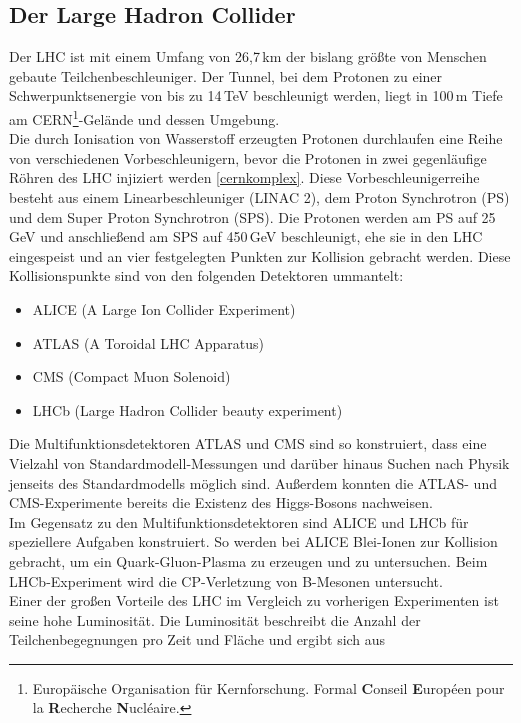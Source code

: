 \subsection{Der Large Hadron Collider}
Der LHC ist mit einem Umfang von 26,7\,km der bislang größte von Menschen gebaute Teilchenbeschleuniger. Der Tunnel, bei dem Protonen zu einer Schwerpunktsenergie von bis zu 14\,TeV beschleunigt werden, liegt in 100\,m Tiefe am CERN\footnote{Europäische Organisation für Kernforschung. Formal \textbf{C}onseil \textbf{E}uropéen pour la \textbf{R}echerche \textbf{N}ucléaire.}-Gelände und dessen Umgebung.\\
Die durch Ionisation von Wasserstoff erzeugten Protonen \cite{duoplasma} durchlaufen eine Reihe von verschiedenen Vorbeschleunigern, bevor die Protonen in zwei gegenläufige Röhren des LHC injiziert werden \ref{cernkomplex}. 
Diese Vor\-be\-schleuniger\-reihe besteht aus einem Linearbeschleuniger (LINAC 2), dem Proton Synchrotron (PS) und dem Super Proton Synchrotron (SPS). Die Protonen werden am PS auf 25\,GeV und anschließend am SPS auf 450\,GeV beschleunigt, ehe sie in den LHC eingespeist und an vier festgelegten Punkten zur Kollision gebracht werden. Diese Kollisionspunkte sind von den folgenden Detektoren ummantelt:
\begin{itemize}
\item ALICE (A Large Ion Collider Experiment)
\item ATLAS (A Toroidal LHC Apparatus)
\item CMS (Compact Muon Solenoid)
\item LHCb (Large Hadron Collider beauty experiment)
\end{itemize}
Die Multifunktionsdetektoren ATLAS \cite{atlas} und CMS sind so konstruiert, dass eine Vielzahl von Standardmodell-Messungen und darüber hinaus Suchen nach Physik jenseits des Standardmodells möglich sind. Außerdem konnten die ATLAS- und CMS-Experimente bereits die Existenz des Higgs-Bosons nachweisen.\\
Im Gegensatz zu den Multifunktionsdetektoren sind ALICE \cite{alice} und LHCb \cite{lhcb} für speziellere Aufgaben konstruiert. So werden bei ALICE Blei-Ionen zur Kollision gebracht, um ein Quark-Gluon-Plasma zu erzeugen und zu untersuchen. Beim LHCb-Experiment wird die CP-Verletzung von B-Mesonen untersucht.
\\
Einer der großen Vorteile des LHC im Vergleich zu vorherigen Experimenten ist seine hohe Luminosität. Die Luminosität beschreibt die Anzahl der Teilchenbegegnungen pro Zeit und Fläche und ergibt sich aus
